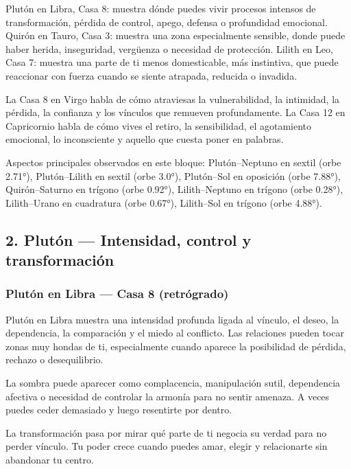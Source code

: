 \documentclass[11pt,a4paper]{article}
\begin{document}
Plutón en Libra, Casa 8: muestra dónde puedes vivir procesos intensos de transformación, pérdida de control, apego, defensa o profundidad emocional.
Quirón en Tauro, Casa 3: muestra una zona especialmente sensible, donde puede haber herida, inseguridad, vergüenza o necesidad de protección.
Lilith en Leo, Casa 7: muestra una parte de ti menos domesticable, más instintiva, que puede reaccionar con fuerza cuando se siente atrapada, reducida o invadida.

La Casa 8 en Virgo habla de cómo atraviesas la vulnerabilidad, la intimidad, la pérdida, la confianza y los vínculos que remueven profundamente.
La Casa 12 en Capricornio habla de cómo vives el retiro, la sensibilidad, el agotamiento emocional, lo inconsciente y aquello que cuesta poner en palabras.

Aspectos principales observados en este bloque: Plutón–Neptuno en sextil (orbe 2.71°), Plutón–Lilith en sextil (orbe 3.0°), Plutón–Sol en oposición (orbe 7.88°), Quirón–Saturno en trígono (orbe 0.92°), Lilith–Neptuno en trígono (orbe 0.28°), Lilith–Urano en cuadratura (orbe 0.67°), Lilith–Sol en trígono (orbe 4.88°).

\vspace{0.8cm}

\subsection{2. Plutón — Intensidad, control y transformación}

\subsubsection*{Plutón en Libra — Casa 8 (retrógrado)}

Plutón en Libra muestra una intensidad profunda ligada al vínculo, el deseo, la dependencia, la comparación y el miedo al conflicto. Las relaciones pueden tocar zonas muy hondas de ti, especialmente cuando aparece la posibilidad de pérdida, rechazo o desequilibrio.

La sombra puede aparecer como complacencia, manipulación sutil, dependencia afectiva o necesidad de controlar la armonía para no sentir amenaza. A veces puedes ceder demasiado y luego resentirte por dentro.

La transformación pasa por mirar qué parte de ti negocia su verdad para no perder vínculo. Tu poder crece cuando puedes amar, elegir y relacionarte sin abandonar tu centro.
\end{document}
